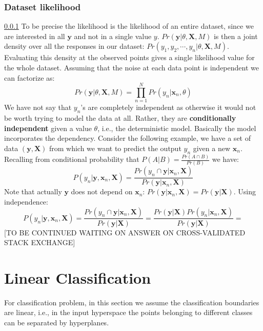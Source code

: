 \documentclass[12pt, letterpaper]{article}
\theoremstyle{definition}
\newcommand{\X}{\mathrm{\mathbf{X}}}
\newcommand{\y}{\mathbf{y}}
\newcommand{\x}{\mathbf{x}}
\begin{document}
\subsubsection{Dataset likelihood}
\label{dataset likelihood}
\ref{dataset likelihood}
To be precise the likelihood is the likelihood of an entire dataset, since we are interested in all $\y$ and not in a single value $y$. $Pr(\y|\theta,\X,M)$ is then a joint density over all the responses in our dataset: $Pr(y_1, y_2, \cdots, y_n|\theta,\X,M)$. Evaluating this density at the observed points gives a single likelihood value for the whole dataset.	 Assuming that the noise at each data point is independent we can factorize as:
\begin{equation}
Pr(\y|\theta,\X,M) = \prod_{n=1}^N Pr(y_n|\x_n, \theta)
\end{equation}
We have not say that $y_n$'s are completely independent as otherwise it would not be worth trying to model the data at all. Rather, they are \textbf{conditionally independent} given a value $\theta$, i.e., the deterministic model.
Basically the model incorporates the dependency. Consider the following example, we have a set of data $(\y,\X)$ from which we want to predict the output $y_n$ given a new $\x_n$. Recalling from conditional probability that $P(A|B) = \frac{Pr(A\cap B)}{Pr(B)}$ we have:
\begin{equation}
P(y_n|\y,\x_n, \X) = \frac{Pr(y_n\cap \y|\x_n,\X)}{Pr(\y|\x_n,\X)}
\end{equation}
Note that actually $\y$ does not depend on $\x_n$: $Pr(\y|\x_n,\X) = Pr(\y|\X)$. Using independence:
\begin{equation}
P(y_n|\y,\x_n, \X) = \frac{Pr(y_n\cap \y|\x_n,\X)}{Pr(\y|\X)} = \frac{Pr(\y|\X) Pr(y_n|\x_n,\X)}{Pr(\y|\X)} = 
\end{equation}
[TO BE CONTINUED WAITING ON ANSWER ON CROSS-VALIDATED STACK EXCHANGE]

\newpage
\section{Linear Classification}
For classification problem, in this section we assume the classification boundaries are linear, i.e., in the input hyperspace the points belonging to different classes can be separated by hyperplanes. 
\end{document}
